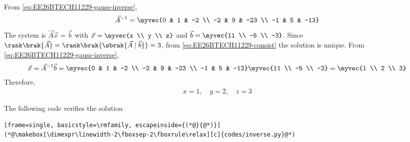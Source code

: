 \begin{enumerate}[label=\thesubsection.\arabic*, ref=\thesubsection.\theenumi]
{\begin{align}
\end{align}
}
From \eqref{eq:EE26BTECH11229-gauss-inverse},
\begin{align}
	\vec{A}^{-1} = \myvec{0 & 1 & -2 \\ -2 & 9 & -23 \\ -1 & 5 & -13}
\end{align}
The system is $\vec{A}\vec{x} = \vec{b}$ with $\vec{x} = \myvec{x \\ y \\ z}$ and $\vec{b} = \myvec{11 \\ -5 \\ -3}$. Since $\rank\brak{\vec{A}} = \rank\brak{\sbrak{\vec{A} \mid \vec{b}}} = 3$, from \eqref{eq:EE26BTECH11229-consist} the solution is unique. From \eqref{eq:EE26BTECH11229-gauss-inverse},
\begin{align}
	\vec{x} = \vec{A}^{-1}\vec{b} = \myvec{0 & 1 & -2 \\ -2 & 9 & -23 \\ -1 & 5 & -13}\myvec{11 \\ -5 \\ -3} = \myvec{1 \\ 2 \\ 3}
\end{align}
Therefore,
\begin{align}
	x = 1, \quad y = 2, \quad z = 3
\end{align}

The following code verifies the solution
\begin{lstlisting}[frame=single, basicstyle=\rmfamily, escapeinside={(*@}{@*)}]
(*@\makebox[\dimexpr\linewidth-2\fboxsep-2\fboxrule\relax][c]{codes/inverse.py}@*)
\end{lstlisting}
\end{enumerate}
